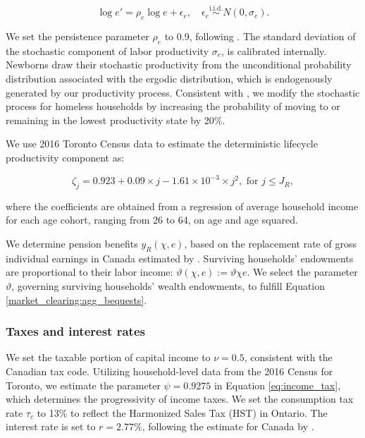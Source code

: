 \documentclass[parskip=full]{article}
\begin{document}
\begin{equation*}
  \log e' = \rho_{e} \log e + \epsilon_{e},\quad \epsilon_{e}\overset{\mathrm{i.i.d.}} \sim N(0,\sigma_{e}).
\end{equation*}

\noindent We set the persistence parameter $\rho_{e}$ to 0.9, following \citet{gkkoc}. The standard deviation of the stochastic component of labor productivity $\sigma_{e}$, is calibrated internally. Newborns draw their stochastic productivity from the unconditional probability distribution associated with the ergodic distribution, which is endogenously generated by our productivity process. Consistent with \citet{az-2024}, we modify the stochastic process for homeless households by increasing the probability of moving to or remaining in the lowest productivity state by 20\%.  

We use 2016 Toronto Census data to estimate the deterministic lifecycle productivity component as:

\begin{equation*}
\zeta_j = 0.923+0.09\times j-1.61\times 10^{-3}\times j^{2}, \mbox{ for } j\leq J_{R},
\end{equation*}

\noindent where the coefficients are obtained from a regression of average household income for each age cohort, ranging from 26 to 64, on age and age squared. 

We determine pension benefits ${y_{R}(\chi,e)}$, based on the replacement rate of gross individual earnings in Canada estimated by \citet{OECD-pension}. Surviving households' endowments are proportional to their labor income: $\vartheta(\chi,e):=\vartheta \chi e$. We select the parameter $\vartheta$, governing surviving households' wealth endowments, to fulfill Equation \eqref{market_clearing:agg_bequests}.

\subsubsection{Taxes and interest rates}

We set the taxable portion of capital income to $\nu=0.5$, consistent with the Canadian tax code. Utilizing household-level data from the 2016 Census for Toronto, we estimate the parameter $\psi=0.9275$ in Equation \eqref{eq:income_tax}, which determines the progressivity of income taxes. We set the consumption tax rate $\tau_{c}$ to 13\% to reflect the Harmonized Sales Tax (HST) in Ontario. The interest rate is set to $r=2.77\%$, following the estimate for Canada by \citet{bruneau-etal-2018}.
\end{document}
